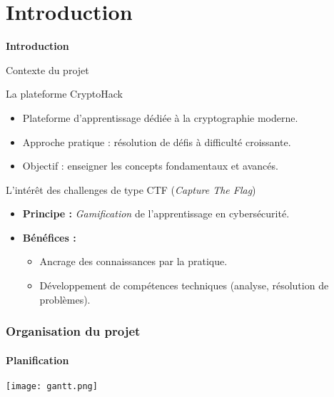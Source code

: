 
\section{Introduction}

\begin{frame}
    \centering
    \Huge{\bfseries Introduction}
\end{frame}

\begin{frame}{Contexte du projet}

    \begin{block}{La plateforme CryptoHack}
        \begin{itemize}
            \item Plateforme d'apprentissage dédiée à la cryptographie moderne.
            \item Approche pratique : résolution de défis à difficulté croissante.
            \item Objectif : enseigner les concepts fondamentaux et avancés.
        \end{itemize}
    \end{block}

    \vspace{0.5cm}

    \begin{alertblock}{L'intérêt des challenges de type CTF (\textit{Capture The Flag})}
        \begin{itemize}
            \item \textbf{Principe :} \textit{Gamification} de l'apprentissage en cybersécurité.
            \item \textbf{Bénéfices :}
                \begin{itemize}
                    \item Ancrage des connaissances par la pratique.
                    \item Développement de compétences techniques (analyse, résolution de problèmes).
                \end{itemize}
        \end{itemize}
    \end{alertblock}

\end{frame}

\begin{frame}
    \frametitle{Organisation du projet}
    \framesubtitle{Planification}
    \centering
    \texttt{[image: gantt.png]}
\end{frame}

